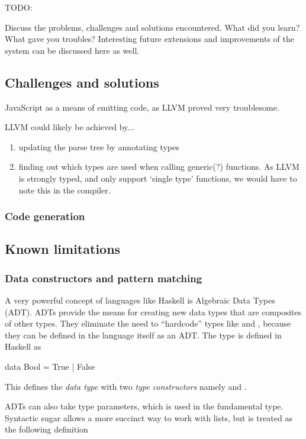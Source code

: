 
TODO:

Discuss the problems, challenges and solutions encountered. What did you learn? What gave you troubles? Interesting future extensions and improvements of the system can be discussed here as well.

\subsection{Challenges and solutions}
JavaScript as a means of emitting code, as LLVM proved very troublesome.

LLVM could likely be achieved by...
\begin{enumerate}
  \item updating the parse tree by annotating types
  \item finding out which types are used when calling generic(?) functions. As LLVM is strongly typed, and only support `single type' functions, we would have to note this in the compiler.
\end{enumerate}

\subsubsection{Code generation}

\subsection{Known limitations}
\subsubsection{Data constructors and pattern matching}
A very powerful concept of languages like Haskell is Algebraic Data Types (ADT). ADTs provide the means for creating new data types that are composites of other types. They eliminate the need to ``hardcode'' types like  and , because they can be defined in the language itself as an ADT. The  type is defined in Haskell as

\begin{haskell}
data Bool = True | False
\end{haskell}

This defines the \emph{data type}  with two \emph{type constructors} namely  and .

ADTs can also take type parameters, which is used in the fundamental  type. Syntactic sugar allows a more succinct way to work with lists, but is treated as the following definition

